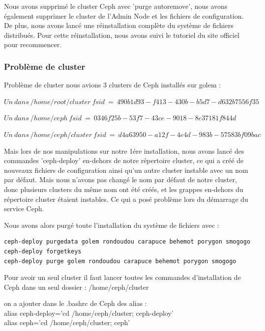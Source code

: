 \documentclass[12pt]{article}
\begin{document}
Nous avons supprimé le cluster Ceph avec 'purge autoremove', nous avons également supprimer le cluster de l'Admin Node et les fichiers de configuration. De plus, nous avons lancé une réinstallation complète du système de fichiers distribués. Pour cette réinstallation, nous avons suivi le tutoriel du site officiel pour recommencer.
	\subsubsection{Problème de cluster}
	Problème de cluster nous avions 3 clusters de Ceph installés sur golem :
	
 $ Un\ dans\ /home/root/cluster\ fsid\ =\ 490b1d93-f413-430b-b5d7-d632b7556f35$
	 
 $ Un\ dans\ /home/ceph\ fsid\ =\ 0346f25b-53f7-43ce-9018-8e37181f844d$
 
	 $ Un\ dans\ /home/ceph/cluster\ fsid\ =\ d4a63950-a12f-4e4d-983b-57583bf09bac$
	 
	 Mais lors de nos manipulations sur notre 1ére installation, nous avons lancé des commandes 'ceph-deploy' en-dehors de notre répertoire cluster, ce qui a créé de nouveaux fichiers de configuration ainsi qu'un autre cluster instable avec un nom par défaut. Mais nous n'avons pas changé le nom par défaut de notre cluster, donc plusieurs clusters du même nom ont été créés, et les grappes en-dehors du répertoire cluster étaient instables. Ce qui a posé problème lors du démarrage du service Ceph.	

Nous avons alors purgé toute l'installation du système de fichiers avec :
\begin{verbatim}
ceph-deploy purgedata golem rondoudou carapuce behemot porygon smogogo
ceph-deploy forgetkeys
ceph-deploy purge golem rondoudou carapuce behemot porygon smogogo
\end{verbatim}

Pour avoir un seul cluster il faut lancer toutes les commandes d'installation de Ceph dans un seul dossier : /home/ceph/cluster

on a ajouter dans le .bashrc de Ceph des alias :
\\ alias ceph-deploy='cd /home/ceph/cluster; ceph-deploy' 
\\ alias ceph='cd /home/ceph/cluster; ceph' 
\end{document}
